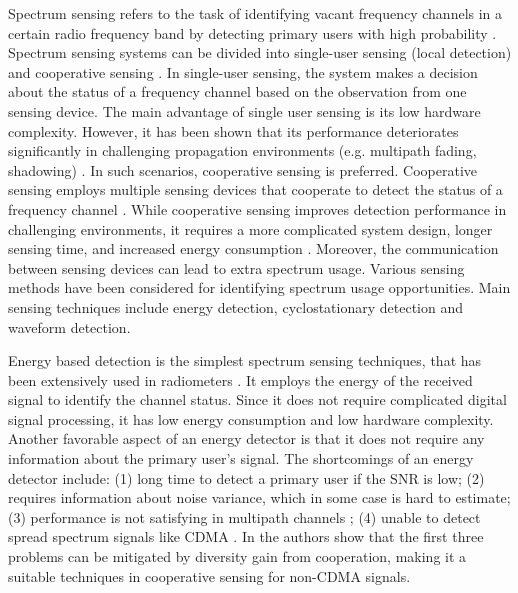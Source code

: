 Spectrum sensing refers to the task of identifying vacant frequency channels in a certain radio frequency band by detecting primary users with high probability \cite{umar2012spectrum}. 
Spectrum sensing systems can be divided into single-user sensing (local detection) and cooperative sensing \cite{wang2011advances, akyildiz2011cooperative, ma2008soft, axell2010overview}. In single-user sensing, the system makes a decision about the status of a frequency channel based on the observation from one sensing device. The main advantage of single user sensing is its low hardware complexity. However, it has been shown that its performance deteriorates significantly in challenging propagation environments (e.g. multipath fading, shadowing) \cite{akyildiz2011cooperative}. In such scenarios, cooperative sensing is preferred. Cooperative sensing employs  multiple sensing devices that cooperate to detect the status of a frequency channel \cite{ganesan2005cooperative, arslan2007cognitive}. While cooperative sensing improves detection performance in challenging environments, it requires a more complicated system design,  longer sensing time,  and increased energy consumption \cite{akyildiz2011cooperative}.  
Moreover, the communication between sensing devices can lead to extra spectrum usage. 
Various sensing methods have been considered for identifying spectrum usage opportunities. Main sensing techniques include  energy detection, cyclostationary detection and waveform detection. 

Energy based detection is the simplest spectrum sensing techniques, that has been extensively used in radiometers \cite{cabric2004implementation, poor1994introduction, urkowitz1967energy}. It employs the energy of the received signal to identify the channel status. Since it does not require complicated digital signal processing, it has low energy consumption and low hardware complexity.  Another favorable aspect of an energy detector is that it does not require  any information about the primary user's signal.  
The shortcomings of an energy detector include: (1) long time to detect a  primary user if the SNR is low; (2) requires information about noise variance, which in some case is hard to estimate; (3) performance is not satisfying in multipath channels \cite{akyildiz2011cooperative}; (4) unable to detect spread spectrum signals like CDMA \cite{urkowitz1967energy, akyildiz2011cooperative}. 
In \cite{akyildiz2011cooperative} the authors show that the first three problems can be mitigated by diversity gain from cooperation,  making it a suitable techniques in cooperative sensing for non-CDMA signals.  

